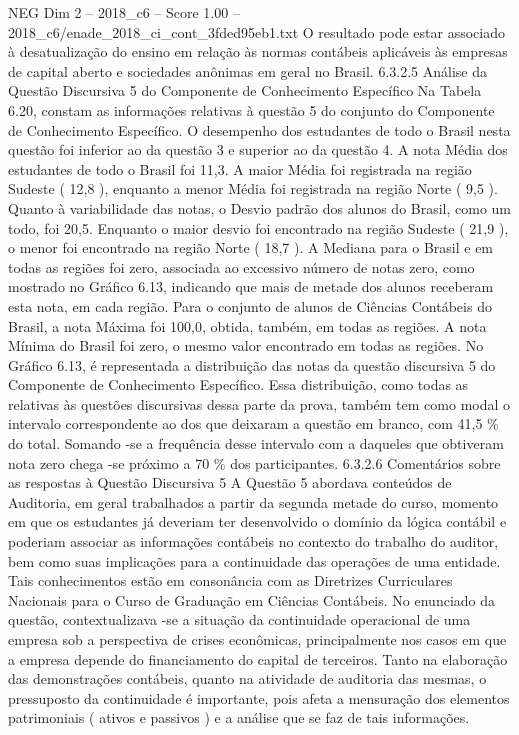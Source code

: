 \begin{textsample}{NEG Dim 2 – 2018\_c6 – Score 1.00 – 2018\_c6/enade\_2018\_ci\_cont\_3fded95eb1.txt}
O resultado pode estar associado à desatualização do ensino em relação às normas contábeis aplicáveis às empresas de capital aberto e sociedades anônimas em geral no Brasil. 6.3.2.5 Análise da Questão Discursiva 5 do Componente de Conhecimento Específico Na Tabela 6.20, constam as informações relativas à questão 5 do conjunto do Componente de Conhecimento Específico.
O desempenho dos estudantes de todo o Brasil nesta questão foi inferior ao da questão 3 e superior ao da questão 4.
A nota Média dos estudantes de todo o Brasil foi 11,3.
A maior Média foi registrada na região Sudeste ( 12,8 ), enquanto a menor Média foi registrada na região Norte ( 9,5 ).
Quanto à variabilidade das notas, o Desvio padrão dos alunos do Brasil, como um todo, foi 20,5.
Enquanto o maior desvio foi encontrado na região Sudeste ( 21,9 ), o menor foi encontrado na região Norte ( 18,7 ).
A Mediana para o Brasil e em todas as regiões foi zero, associada ao excessivo número de notas zero, como mostrado no Gráfico 6.13, indicando que mais de metade dos alunos receberam esta nota, em cada região.
Para o conjunto de alunos de Ciências Contábeis do Brasil, a nota Máxima foi 100,0, obtida, também, em todas as regiões.
A nota Mínima do Brasil foi zero, o mesmo valor encontrado em todas as regiões.
No Gráfico 6.13, é representada a distribuição das notas da questão discursiva 5 do Componente de Conhecimento Específico.
Essa distribuição, como todas as relativas às questões discursivas dessa parte da prova, também tem como modal o intervalo correspondente ao dos que deixaram a questão em branco, com 41,5 \% do total.
Somando -se a frequência desse intervalo com a daqueles que obtiveram nota zero chega -se próximo a 70 \% dos participantes. 6.3.2.6 Comentários sobre as respostas à Questão Discursiva 5 A Questão 5 abordava conteúdos de Auditoria, em geral trabalhados a partir da segunda metade do curso, momento em que os estudantes já deveriam ter desenvolvido o domínio da lógica contábil e poderiam associar as informações contábeis no contexto do trabalho do auditor, bem como suas implicações para a continuidade das operações de uma entidade.
Tais conhecimentos estão em consonância com as Diretrizes Curriculares Nacionais para o Curso de Graduação em Ciências Contábeis.
No enunciado da questão, contextualizava -se a situação da continuidade operacional de uma empresa sob a perspectiva de crises econômicas, principalmente nos casos em que a empresa depende do financiamento do capital de terceiros.
Tanto na elaboração das demonstrações contábeis, quanto na atividade de auditoria das mesmas, o pressuposto da continuidade é importante, pois afeta a mensuração dos elementos patrimoniais ( ativos e passivos ) e a análise que se faz de tais informações.

\end{textsample}
